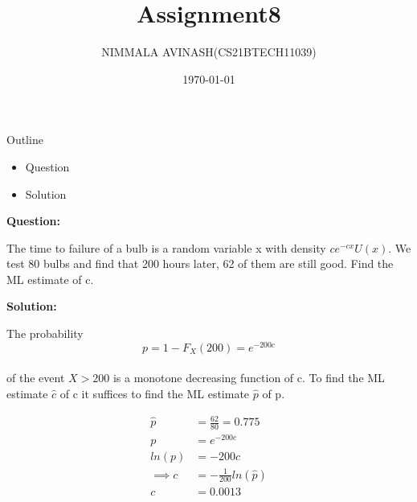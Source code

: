 \documentclass{beamer}
\title{Assignment8}
\author{NIMMALA AVINASH(CS21BTECH11039)}
\institute{IITH}
\date{\today}
\begin{document}
\maketitle
\begin{frame}{Outline}
\begin{itemize}
\item Question
\item Solution
\end{itemize}
\end{frame}
\begin{frame}
{\LARGE \textbf{Question:\\}}
\begin{large}

The time to failure of a bulb is a random variable x with density $ ce^{-cx}U(x)$. We test 80 bulbs 
and find that 200 hours later, 62 of them are still good. Find the ML estimate of c. \\

\end{large}
\end{frame}
\begin{frame}
{\LARGE \textbf{Solution:\\}}
\begin{large}
The probability\\
$$ p=1-F_{X}(200)=e^{-200c} $$\\
of the event ${X > 200}$ is a monotone decreasing function of c. To find the ML estimate $\hat{c}$ of c it suffices to find
the ML estimate $ \hat{p} $ of p.\\
\end{large}
\end{frame}
\begin{frame}
\begin{large}
\begin{align}
\hat{p}&= \frac{62}{80} = 0.775 \\
p&=e^{-200c}\\
ln(p)&=-200c\\
\implies c&=-\frac{1}{200}ln(\hat{p}) \\
c&=0.0013
\end{align}
\end{large}
\end{frame}
\end{document}

